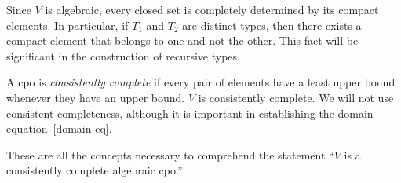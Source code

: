 \documentclass{amsart}
\begin{document}
Since $V$ is algebraic, every closed set is completely determined
by its compact elements. In particular, if $T_1$ and $T_2$ are
distinct types, then there exists a compact element that belongs
to one and not the other. This fact will be significant in the
construction of recursive types.

A cpo is \emph{consistently complete} if every pair of elements
have a least upper bound whenever they have an upper bound. $V$
is consistently complete. We will not use consistent
completeness, although it is important in establishing the domain
equation~\eqref{domain-eq}.

These are all the concepts necessary to comprehend the statement
``$V$ is a consistently complete algebraic cpo.''


\end{document}
